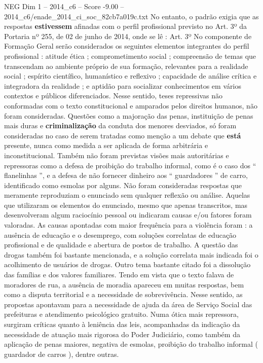 \begin{textsample}{NEG Dim 1 – 2014\_c6 – Score -9.00 – 2014\_c6/enade\_2014\_ci\_soc\_82cb7a019c.txt}
No entanto, o padrão exigia que as respostas \textbf{estivessem} afinadas com o perfil profissional previsto no Art. 3º da Portaria nº 255, de 02 de junho de 2014, onde se lê : Art. 3º No componente de Formação Geral serão considerados os seguintes elementos integrantes do perfil profissional : atitude ética ; comprometimento social ; compreensão de temas que transcendam ao ambiente próprio de sua formação, relevantes para a realidade social ; espírito científico, humanístico e reflexivo ; capacidade de análise crítica e integradora da realidade ; e aptidão para socializar conhecimentos em vários contextos e públicos diferenciados.
Nesse sentido, teses repressivas não conformadas com o texto constitucional e amparados pelos direitos humanos, não foram consideradas.
Questões como a majoração das penas, instituição de penas mais duras e \textbf{criminalização} da conduta dos menores desviados, só foram consideradas no caso de serem tratadas como menção a um debate que \textbf{está} presente, nunca como medida a ser aplicada de forma arbitrária e inconstitucional.
Também não foram previstas visões mais autoritárias e repressoras como a defesa de proibição do trabalho informal, como é o caso dos “ flanelinhas ”, e a defesa de não fornecer dinheiro aos “ guardadores ” de carro, identificado como esmolas por alguns.
Não foram consideradas respostas que meramente reproduziam o enunciado sem qualquer reflexão ou análise.
Aquelas que utilizaram os elementos do enunciado, mesmo que apenas transcritos, mas desenvolveram algum raciocínio pessoal ou indicaram causas e/ou fatores foram valoradas.
As causas apontadas com maior frequência para a violência foram : a ausência de educação e o desemprego, com soluções correlatas de educação profissional e de qualidade e abertura de postos de trabalho.
A questão das drogas também foi bastante mencionada, e a solução correlata mais indicada foi o acolhimento de usuários de drogas.
Outro tema bastante citado foi a dissolução das famílias e dos valores familiares.
Tendo em vista que o texto falava de moradores de rua, a ausência de moradia apareceu em muitas respostas, bem como a disputa territorial e a necessidade de sobrevivência.
Nesse sentido, as propostas apontavam para a necessidade de ajuda da área de Serviço Social das prefeituras e atendimento psicológico gratuito.
Numa ótica mais repressora, surgiram críticas quanto à leniência das leis, acompanhadas da indicação da necessidade de atuação mais rigorosa do Poder Judiciário, como também da aplicação de penas maiores, negativa de esmolas, proibição do trabalho informal ( guardador de carros ), dentre outras.

\end{textsample}

